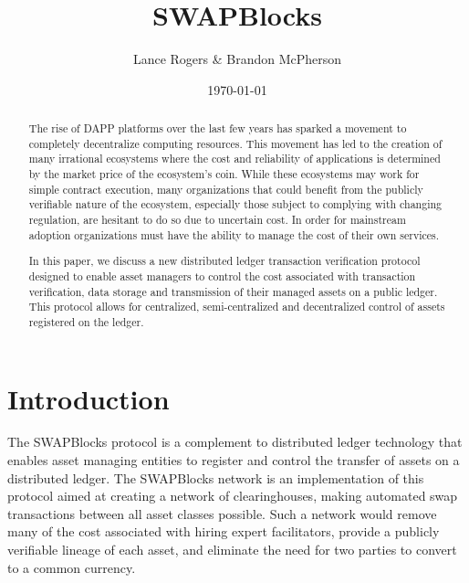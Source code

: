 \documentclass[12pt]{article}
\title{SWAPBlocks\\}
\author{Lance Rogers \& Brandon McPherson}
\date{\today}
\begin{document}
\maketitle

\begin{abstract}
	

	
	
The rise of DAPP platforms over the last few years has sparked a movement to 
completely decentralize computing resources.  This movement has led to 
the creation of many irrational ecosystems where the cost and reliability of
applications is determined by the market price of the ecosystem's coin. %
While these ecosystems may work for simple contract execution,
many organizations that could benefit from the publicly verifiable nature of the
ecosystem, especially those subject to complying with changing regulation,
	are hesitant to do so due to uncertain cost. 
In order for mainstream adoption organizations must have the ability to manage
the cost of their own services.

In this paper, we discuss a new distributed ledger transaction verification
protocol designed to enable asset managers to control the cost associated with
transaction verification, data storage and transmission of their managed assets on 
	a public ledger.
This protocol allows for centralized, semi-centralized 
and decentralized control of assets registered on the ledger. 


\end{abstract}

\pagebreak

\tableofcontents

\pagebreak

\section{Introduction}



The SWAPBlocks protocol is a complement to distributed ledger technology that enables
asset managing entities to register and control the transfer of assets on a distributed
ledger.  The SWAPBlocks network is an implementation of this protocol aimed at creating a network
of clearinghouses, making automated swap transactions between all asset classes possible.  Such a network
would remove many of the cost associated with hiring expert facilitators, provide a publicly verifiable
lineage of each asset, and eliminate the need for two parties to convert to a common currency.
\end{document}
